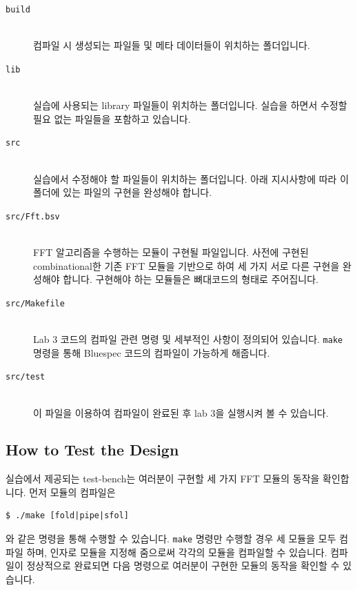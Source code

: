 \documentclass{article}
\begin{document}
\begin{description}
\item [\texttt{build}]\hfill \ \\
컴파일 시 생성되는 파일들 및 메타 데이터들이 위치하는 폴더입니다.

\item [\texttt{lib}]\hfill \ \\
	실습에 사용되는 library 파일들이 위치하는 폴더입니다.
	실습을 하면서 수정할 필요 없는 파일들을 포함하고 있습니다.

\item [\texttt{src}]\hfill \ \\ 
	실습에서 수정해야 할 파일들이 위치하는 폴더입니다.
	아래 지시사항에 따라 이 폴더에 있는 파일의 구현을 완성해야 합니다.

\item [\texttt{src/Fft.bsv}]\hfill \ \\
	FFT 알고리즘을 수행하는 모듈이 구현될 파일입니다.
	사전에 구현된 combinational한 기존 FFT 모듈을 기반으로 하여
	세 가지 서로 다른 구현을 완성해야 합니다.
	구현해야 하는 모듈들은 뼈대코드의 형태로 주어집니다.

\item [\texttt{src/Makefile}]\hfill \ \\
	Lab 3 코드의 컴파일 관련 명령 및 세부적인 사항이 정의되어 있습니다. \texttt{make} 명령을 통해
	Bluespec 코드의 컴파일이 가능하게 해줍니다.

\item [\texttt{src/test}]\hfill \ \\
	이 파일을 이용하여 컴파일이 완료된 후 lab 3을 실행시켜 볼 수 있습니다.

\end{description}

\subsection{How to Test the Design}
실습에서 제공되는 test-bench는 여러분이 구현할 세 가지 FFT 모듈의 동작을 확인합니다.
먼저 모듈의 컴파일은 

\begin{Verbatim}[frame=single]
    $ ./make [fold|pipe|sfol]
\end{Verbatim}
와 같은 명령을 통해 수행할 수 있습니다. \texttt{make} 명령만 수행할 경우 세 모듈을 모두 컴파일 하며,
인자로 모듈을 지정해 줌으로써 각각의 모듈을 컴파일할 수 있습니다.
컴파일이 정상적으로 완료되면 다음 명령으로 여러분이 구현한 모듈의 동작을 확인할 수 있습니다.
\end{document}
